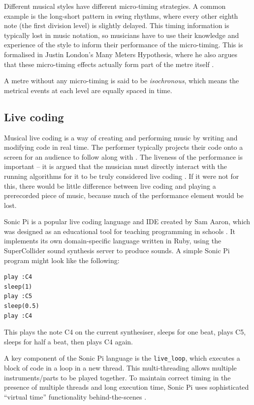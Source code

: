 \documentclass[12pt,twoside,openright]{report}
\begin{document}
Different
musical styles have different micro-timing strategies. A common example is the
long-short pattern in swing rhythms, where every other eighth note (the first
division level) is slightly delayed. This timing information is typically lost
in music notation, so musicians have to use
their knowledge and experience of the style to inform their performance of the
micro-timing. This is formalised in Justin London's Many Meters Hypothesis, where he also argues that these micro-timing effects actually form part of the metre itself \cite{london2012}.

A metre without any micro-timing is said to be \emph{isochronous},
which means the metrical events at each level are equally spaced in time.


\subsection{Live coding} \label{live_coding_background}

Musical live coding is a way of creating and performing music by writing and
modifying code in real time. The performer typically projects their code onto a
screen for an audience to follow along with \cite{magnusson2011}. The liveness of the
performance is important -- it is argued that the musician must directly
interact with the running algorithms for it to be truly considered live coding
\cite{collins2011}. If it were not for this, there would be little difference between live coding and playing a prerecorded piece of music, because much of the performance element would be lost.

Sonic Pi is a popular live coding language and IDE created by Sam Aaron, which
was designed as an educational tool for teaching programming in schools \cite{aaron2013}. It
implements its own domain-specific language written in Ruby, using the
SuperCollider sound synthesis server to produce sounds. A simple
Sonic Pi program might look like the following:

\begin{verbatim}
play :C4
sleep(1)
play :C5
sleep(0.5)
play :C4
\end{verbatim}

This plays the note C4 on the current synthesiser, sleeps for one beat, plays C5,
sleeps for half a beat, then plays C4 again.

A key component of the Sonic Pi language is the \verb'live_loop', which executes a
block of code in a loop in a new thread. This multi-threading allows multiple instruments/parts to be played together. To maintain correct timing in the presence
of multiple threads and long execution time, Sonic Pi uses sophisticated
``virtual time'' functionality behind-the-scenes \cite{aaron2014}.
\end{document}
